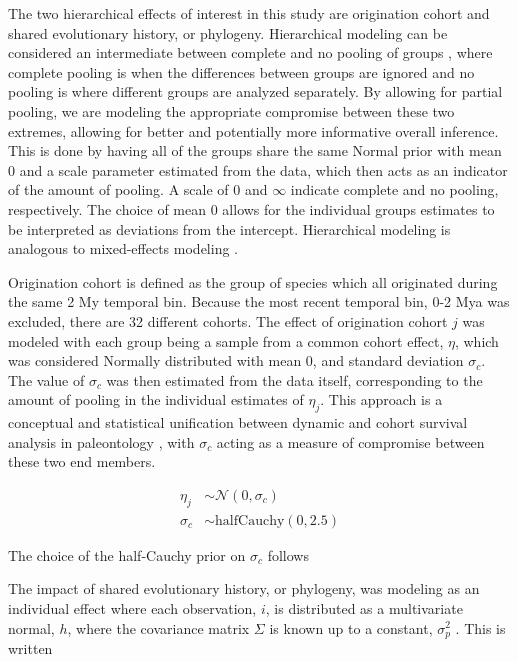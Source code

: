 \documentclass[12pt,letterpaper]{article}
\begin{document}
The two hierarchical effects of interest in this study are origination cohort and shared evolutionary history, or phylogeny. Hierarchical modeling can be considered an intermediate between complete and no pooling of groups \citep{Gelman2007}, where complete pooling is when the differences between groups are ignored and no pooling is where different groups are analyzed separately. By allowing for partial pooling, we are modeling the appropriate compromise between these two extremes, allowing for better and potentially more informative overall inference. This is done by having all of the groups share the same Normal prior with mean 0 and a scale parameter estimated from the data, which then acts as an indicator of the amount of pooling. A scale of 0 and \(\infty\) indicate complete and no pooling, respectively. The choice of mean 0 allows for the individual groups estimates to be interpreted as deviations from the intercept. Hierarchical modeling is analogous to mixed-effects modeling \citep{Gelman2007}.

Origination cohort is defined as the group of species which all originated during the same 2 My temporal bin. Because the most recent temporal bin, 0-2 Mya was excluded, there are 32 different cohorts. The effect of origination cohort \(j\) was modeled with each group being a sample from a common cohort effect, \(\eta\), which was considered Normally distributed with mean 0, and standard deviation \(\sigma_{c}\). The value of \(\sigma_{c}\) was then estimated from the data itself, corresponding to the amount of pooling in the individual estimates of \(\eta_{j}\). This approach is a conceptual and statistical unification between dynamic and cohort survival analysis in paleontology \citep{Foote1988,Raup1978,Raup1975,VanValen1979,Baumiller1993}, with \(\sigma_{c}\) acting as a measure of compromise between these two end members.

\begin{align*}
  \eta_{j} &\sim \mathcal{N}(0, \sigma_{c}) \\
  \sigma_{c} &\sim \mathrm{halfCauchy}(0, 2.5)
\end{align*}

The choice of the half-Cauchy prior on \(\sigma_{c}\) follows \citet{Gelman2006a}

The impact of shared evolutionary history, or phylogeny, was modeling as an individual effect where each observation, \(i\), is distributed as a multivariate normal, \(h\), where the covariance matrix \(\Sigma\) is known up to a constant, \(\sigma_{p}^{2}\) \citep{Lynch1991,Housworth2004}. This is written
\end{document}
